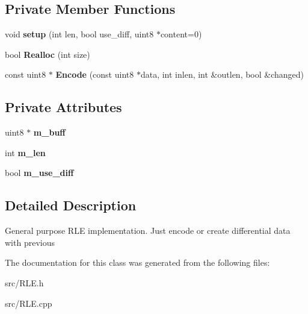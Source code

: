 \subsection*{Private Member Functions}
\begin{DoxyCompactItemize}
\item 
void {\bfseries setup} (int len, bool use\_\-diff, uint8 $\ast$content=0)\label{classRLE__Data_a44592939837439aa85b44acfcba59ec0}

\item 
bool {\bfseries Realloc} (int size)\label{classRLE__Data_a0911ca974c14e47177984cae45f82413}

\item 
const uint8 $\ast$ {\bfseries Encode} (const uint8 $\ast$data, int inlen, int \&outlen, bool \&changed)\label{classRLE__Data_a876907c56b1f7dee6a5a771e7fd2ae92}

\end{DoxyCompactItemize}
\subsection*{Private Attributes}
\begin{DoxyCompactItemize}
\item 
uint8 $\ast$ {\bfseries m\_\-buff}\label{classRLE__Data_ada13bdaeecf99ee384cfccde53168ab3}

\item 
int {\bfseries m\_\-len}\label{classRLE__Data_adaba46dc32f08db8897ea57a0c26a907}

\item 
bool {\bfseries m\_\-use\_\-diff}\label{classRLE__Data_ad78febb8c630e251004761fe5f19a498}

\end{DoxyCompactItemize}


\subsection{Detailed Description}
General purpose RLE implementation. Just encode or create differential data with previous 

The documentation for this class was generated from the following files:\begin{DoxyCompactItemize}
\item 
src/RLE.h\item 
src/RLE.cpp\end{DoxyCompactItemize}
